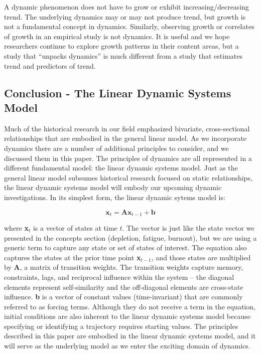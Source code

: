 \documentclass[english,,man]{apa6}
\theoremstyle{definition}
\theoremstyle{definition}
\theoremstyle{definition}
\theoremstyle{remark}
\begin{document}
A dynamic phenomenon does not have to grow or exhibit
increasing/decreasing trend. The underlying dynamics may or may not
produce trend, but growth is not a fundamental concept in dynamics.
Similarly, observing growth or correlates of growth in an empirical
study is not dynamics. It is useful and we hope researchers continue to
explore growth patterns in their content areas, but a study that
\enquote{unpacks dynamics} is much different from a study that estimates
trend and predictors of trend.

\hypertarget{conclusion---the-linear-dynamic-systems-model}{%
\subsection{Conclusion - The Linear Dynamic Systems
Model}\label{conclusion---the-linear-dynamic-systems-model}}

Much of the historical research in our field emphasized bivariate,
cross-sectional relationships that are embodied in the general linear
model. As we incorporate dynamics there are a number of additional
principles to consider, and we discussed them in this paper. The
principles of dynamics are all represented in a different fundamental
model: the linear dynamic systems model. Just as the general linear
model subsumes historical research focused on static relationships, the
linear dynamic systems model will embody our upcoming dynamic
investigations. In its simplest form, the linear dynamic sytems model
is:

\begin{equation}
\textbf{x}_t = \textbf{A} \textbf{x}_{t-1} + \textbf{b}
\end{equation}

\noindent where \textbf{x}\(_t\) is a vector of states at time \(t\).
The vector is just like the state vector we presented in the concepts
section (depletion, fatigue, burnout), but we are using a generic term
to capture any state or set of states of interest. The equation also
captures the states at the prior time point \textbf{x}\(_{t-1}\), and
those states are multiplied by \textbf{A}, a matrix of transition
weights. The transition weights capture memory, constraints, lags, and
reciprocal influence within the system -- the diagonal elements
represent self-similarity and the off-diagonal elements are cross-state
influence. \textbf{b} is a vector of constant values (time-invariant)
that are commonly referred to as forcing terms. Although they do not
receive a term in the equation, initial conditions are also inherent to
the linear dynamic systems model because specifying or identifying a
trajectory requires starting values. The principles described in this
paper are embodied in the linear dynamic systems model, and it will
serve as the underlying model as we enter the exciting domain of
dynamics.
\end{document}
